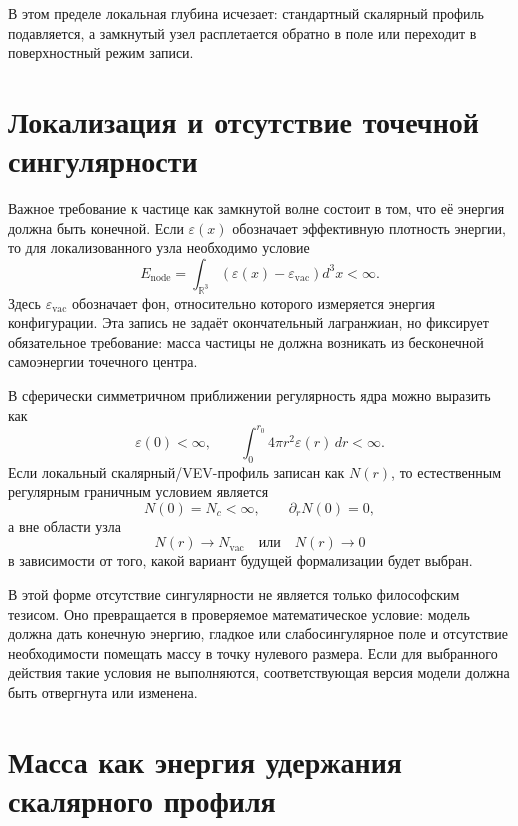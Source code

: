 \documentclass[11pt,a4paper]{article}
\begin{document}
В этом пределе локальная глубина исчезает: стандартный скалярный профиль подавляется, а замкнутый узел расплетается обратно в поле или переходит в поверхностный режим записи.

\section{Локализация и отсутствие точечной сингулярности}

Важное требование к частице как замкнутой волне состоит в том, что её энергия должна быть конечной. Если $\varepsilon(x)$ обозначает эффективную плотность энергии, то для локализованного узла необходимо условие
\begin{equation}
E_{\mathrm{node}}=\int_{\mathbb{R}^3}\left(\varepsilon(x)-\varepsilon_{\mathrm{vac}}\right)d^3x<\infty.
\end{equation}
Здесь $\varepsilon_{\mathrm{vac}}$ обозначает фон, относительно которого измеряется энергия конфигурации. Эта запись не задаёт окончательный лагранжиан, но фиксирует обязательное требование: масса частицы не должна возникать из бесконечной самоэнергии точечного центра.

В сферически симметричном приближении регулярность ядра можно выразить как
\begin{equation}
\varepsilon(0)<\infty, \qquad \int_0^{r_0}4\pi r^2\varepsilon(r)\,dr<\infty.
\end{equation}
Если локальный скалярный/VEV-профиль записан как $N(r)$, то естественным регулярным граничным условием является
\begin{equation}
N(0)=N_c<\infty, \qquad \partial_r N(0)=0,
\end{equation}
а вне области узла
\begin{equation}
N(r)\to N_{\mathrm{vac}} \quad \text{или} \quad N(r)\to 0
\end{equation}
в зависимости от того, какой вариант будущей формализации будет выбран.

В этой форме отсутствие сингулярности не является только философским тезисом. Оно превращается в проверяемое математическое условие: модель должна дать конечную энергию, гладкое или слабосингулярное поле и отсутствие необходимости помещать массу в точку нулевого размера. Если для выбранного действия такие условия не выполняются, соответствующая версия модели должна быть отвергнута или изменена.

\section{Масса как энергия удержания скалярного профиля}
\end{document}
